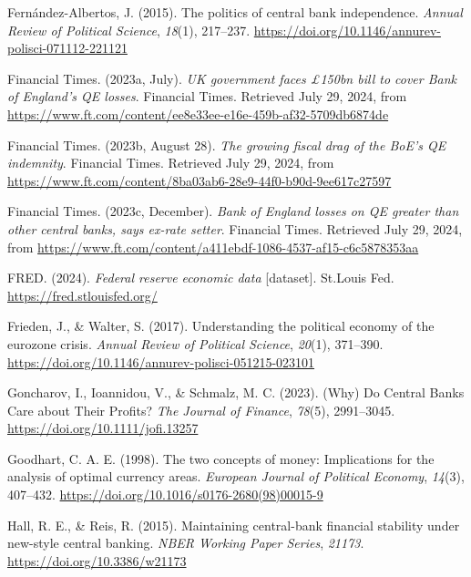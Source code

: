 \documentclass[
  a4paper,
  abstract=true]{scrartcl}
\newlength{\cslhangindent}
\newenvironment{CSLReferences}[2] %
 {\begin{list}{}{%
  \setlength{\itemindent}{0pt}
  \setlength{\leftmargin}{0pt}
  \setlength{\parsep}{0pt}
  \ifodd #1
   \setlength{\leftmargin}{\cslhangindent}
   \setlength{\itemindent}{-1\cslhangindent}
  \fi
  \setlength{\itemsep}{#2\baselineskip}}}
 {\end{list}}
\theoremstyle{definition}
\begin{document}
\begin{CSLReferences}{1}{0}
Fernández-Albertos, J. (2015). The politics of central bank
independence. \emph{Annual Review of Political Science}, \emph{18}(1),
217--237. \url{https://doi.org/10.1146/annurev-polisci-071112-221121}

Financial Times. (2023a, July). \emph{{UK} government faces £150bn bill
to cover {Bank} of {England}'s {QE} losses}. Financial Times. Retrieved
July 29, 2024, from
\url{https://www.ft.com/content/ee8e33ee-e16e-459b-af32-5709db6874de}

Financial Times. (2023b, August 28). \emph{The growing fiscal drag of
the {BoE}'s {QE} indemnity}. Financial Times. Retrieved July 29, 2024,
from
\url{https://www.ft.com/content/8ba03ab6-28e9-44f0-b90d-9ee617c27597}

Financial Times. (2023c, December). \emph{Bank of {England} losses on
{QE} greater than other central banks, says ex-rate setter}. Financial
Times. Retrieved July 29, 2024, from
\url{https://www.ft.com/content/a411ebdf-1086-4537-af15-c6c5878353aa}

FRED. (2024). \emph{Federal reserve economic data} {[}dataset{]}.
St.Louis Fed. \url{https://fred.stlouisfed.org/}

Frieden, J., \& Walter, S. (2017). Understanding the political economy
of the eurozone crisis. \emph{Annual Review of Political Science},
\emph{20}(1), 371--390.
\url{https://doi.org/10.1146/annurev-polisci-051215-023101}

Goncharov, I., Ioannidou, V., \& Schmalz, M. C. (2023). (Why) Do Central
Banks Care about Their Profits? \emph{The Journal of Finance},
\emph{78}(5), 2991--3045. \url{https://doi.org/10.1111/jofi.13257}

Goodhart, C. A. E. (1998). The two concepts of money: Implications for
the analysis of optimal currency areas. \emph{European Journal of
Political Economy}, \emph{14}(3), 407--432.
\url{https://doi.org/10.1016/s0176-2680(98)00015-9}

Hall, R. E., \& Reis, R. (2015). Maintaining central-bank financial
stability under new-style central banking. \emph{NBER Working Paper
Series}, \emph{21173}. \url{https://doi.org/10.3386/w21173}


\end{CSLReferences}
\end{document}
